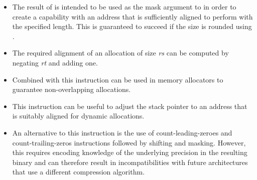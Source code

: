 \begin{itemize}
\item The result of  is intended to be used as the mask argument to  in order to create  a capability with an address that is sufficiently aligned to perform  with the specified length. This  is guaranteed to succeed if the size is rounded using .
\item The required alignment of an allocation of size \emph{rs} can be computed by negating \emph{rt} and adding one.
\item Combined with  this instruction can be used in memory allocators to guarantee non-overlapping allocations.
\item This instruction can be useful to adjust the stack pointer to an address that is suitably aligned for dynamic allocations.
\item An alternative to this instruction is the use of count-leading-zeroes and count-trailing-zeros instructions followed by shifting and masking. However, this requires encoding knowledge of the underlying precision in the resulting binary and can therefore result in incompatibilities with future architectures that use a different compression algorithm.
\end{itemize}

